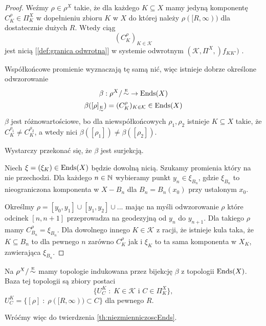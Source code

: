 \begin{proof}
  Weźmy $\rho\in\rho^X$ takie, że dla każdego $K\subseteq X$ mamy jedyną komponentę $C_K^\rho\in\Pi_K^X$ w dopełnieniu zbioru $K$ w $X$ do której należy $\rho([R,\infty))$ dla dostatecznie dużych $R$. Wtedy ciąg 
  $$(C_K^\rho)_{K\in\mathcal{K}}$$ 
  jest nicią [\ref{def:granica odwrotna}] w systemie odwrotnym $(\mathcal{K},\Pi^X,)f_{KK'})$ . 

  Współkońcowe promienie wyznaczają tę samą nić, więc istnieje dobrze określone odwzorowanie 
  $$\beta:\rho^X/\operatorname{\overset{{\scriptscriptstyle E}}{\sim}} \to \operatorname{Ends}(X)$$
  $$\beta([\rho]_{\operatorname{\overset{{\scriptscriptstyle E}}{\sim}}})=(C_K^{\rho})_{K\in\mathcal{K}}\in \operatorname{Ends}(X)$$
  $\beta$ jest różnowartościowe, bo dla niewspółkońcowych $\rho_1,\rho_2$ istnieje $K\subseteq X$ takie, że $C_K^{\rho_1}\neq C_K^{\rho_2}$, a wtedy nici $\beta([\rho_1])\neq \beta([\rho_2])$.

  Wystarczy przekonać się, że $\beta$ jest surjekcją. 

  Niech $\xi=(\xi_K)\in\operatorname{Ends}(X)$ będzie dowolną nicią. Szukamy promienia który na nie przechodzi. Dla każdego $n\in\mathbb{N}$ wybieramy punkt $y_n\in \xi_{B_n}$, gdzie $\xi_{B_n}$ to nieograniczona komponenta w $X-B_n$ dla $B_n=B_n(x_0)$ przy ustalonym $x_0$. 

  Określmy $\rho=[y_0,y_1]\cup[y_1,y_2]\cup...$ mając na myśli odwzorowanie $\rho$ które odcinek $[n, n+1]$ przeprowadza na geodezyjną od $y_n$ do $y_{n+1}$. Dla takiego $\rho$ mamy $C_{B_n}^\rho=\xi_{B_n}$. Dla dowolnego innego $K\in \mathcal{K}$ z racji, że istnieje kula taka, że $K\subseteq B_n$ to dla pewnego $n$ zarówno $C_K^\rho$ jak i $\xi_K$ to ta sama komponenta w $X_K$, zawierająca $\xi_{B_n}$.
\end{proof}

Na $\rho^X/\operatorname{\overset{{\scriptscriptstyle E}}{\sim}}$ mamy topologie indukowana przez bijekcję $\beta$ z topologii $\operatorname{Ends}(X)$. Baza tej topologii są zbiory postaci 
$$\{U_C^K\;:\;K\in\mathcal{K}\text{ i }C\in\Pi_K^X\},$$ 
$U_C^K=\{[\rho]\;:\;\rho([R, \infty))\subset C\}$ dla pewnego $R$.


Wróćmy więc do twierdzenia \ref{th:niezmienniczoscEnds}.

